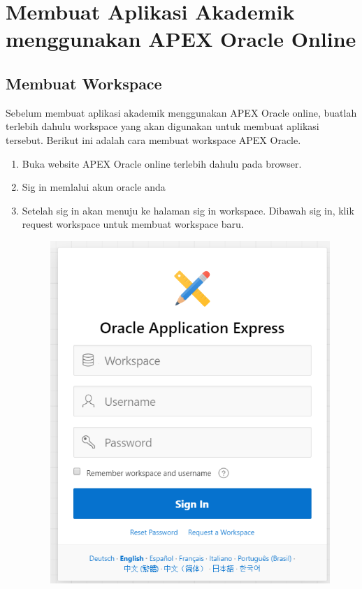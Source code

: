 \chapter{Membuat Aplikasi Akademik menggunakan APEX Oracle Online}

\section{Membuat Workspace}
Sebelum membuat aplikasi akademik menggunakan APEX Oracle online, buatlah terlebih dahulu workspace yang akan digunakan untuk membuat aplikasi tersebut. Berikut ini adalah cara membuat workspace APEX Oracle.
\begin{enumerate}
    \item Buka website APEX Oracle online terlebih dahulu pada browser.
    \item Sig in memlalui akun oracle anda
    \item Setelah sig in akan menuju ke halaman sig in workspace. Dibawah sig in, klik request workspace untuk membuat workspace baru.

\begin{figure}[!htbp]
    \centering
    \includegraphics[scale=0.5]{gambar/request.png}
    \label{penanda}
\end{figure}


\end{enumerate}
